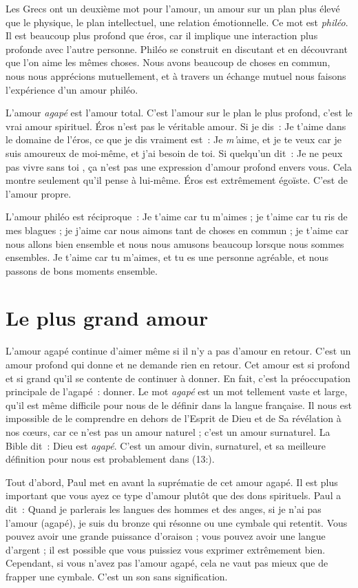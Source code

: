 Les Grecs ont un deuxième mot pour l'amour,
 un amour sur un plan plus élevé que le physique, le plan intellectuel,
 une relation émotionnelle. Ce mot est \emph{philéo}.
 Il est beaucoup plus profond que éros, car il implique une interaction
 plus profonde avec l'autre personne.
 Philéo se construit en discutant et en découvrant que l'on aime
 les mêmes choses. Nous avons beaucoup de choses en commun,
 nous nous apprécions mutuellement, et à travers un échange mutuel
 nous faisons l'expérience d'un amour philéo.

L'amour \emph{agapé} est l'amour total.
 C'est l'amour sur le plan le plus profond, c'est le vrai amour spirituel.
 Éros n'est pas le véritable amour. Si je dis~: \og Je t'aime \fg{}
 dans le domaine de l'éros, ce que je dis vraiment est~:
 \og Je \emph{m'}aime, et je te veux car je suis amoureux de moi-même,
 et j'ai besoin de toi. \fg{}
 Si quelqu'un dit~: \og Je ne peux pas vivre sans toi \fg{},
 ça n'est pas une expression d'amour profond envers vous.
 Cela montre seulement qu'il pense à lui-même.
 Éros est extrêmement égoïste. C'est de l'amour propre.

L'amour philéo est réciproque~: \og Je t'aime car tu m'aimes ;
 je t'aime car tu ris de mes blagues ;
 je j'aime car nous aimons tant de choses en commun ;
 je t'aime car nous allons bien ensemble et nous nous amusons beaucoup
 lorsque nous sommes ensembles. Je t'aime car tu m'aimes,
 et tu es une personne agréable, et nous passons de bons moments ensemble. \fg{}


\section{Le plus grand amour}

L'amour agapé continue d'aimer même si il n'y a pas d'amour en retour.
 C'est un amour profond qui donne et ne demande rien en retour.
 Cet amour est si profond et si grand qu'il se contente
 de continuer à donner.
 En fait, c'est la préoccupation principale de l'agapé~: donner.
 Le mot \emph{agapé} est un mot tellement vaste et large,
 qu'il est même difficile pour nous de le définir dans la langue française.
 Il nous est impossible de le comprendre en dehors de l'Esprit de Dieu
 et de Sa révélation à nos cœurs, car ce n'est pas un amour naturel ;
 c'est un amour surnaturel.
 La Bible dit~: \og Dieu est \emph{agapé}. \fg{}
 C'est un amour divin, surnaturel, et sa meilleure définition pour nous
 est probablement dans (13:).

Tout d'abord, Paul met en avant la suprématie de cet amour agapé.
 Il est plus important que vous ayez ce type d'amour
 plutôt que des dons spirituels. Paul a dit~:
 \og Quand je parlerais les langues des hom\-mes et des anges,
 si je n'ai pas l'amour (agapé), je suis du bronze qui résonne
 ou une cymbale qui retentit. \fg{}
 Vous pouvez avoir une grande puissance d'oraison ;
 vous pouvez avoir une langue d'argent ;
 il est possible que vous puissiez vous exprimer extrêmement bien.
 Cependant, si vous n'avez pas l'amour agapé, cela ne vaut pas mieux
 que de frapper une cymbale. C'est un son sans signification.
 \nowidow

